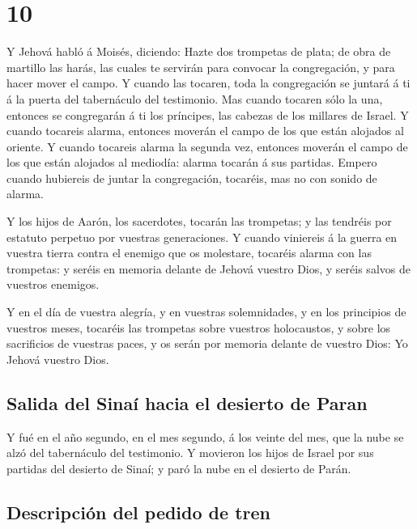 \hypertarget{section-04-10}{%
\section{10}\label{section-04-10}}

 Y Jehová habló á Moisés, diciendo:  Hazte
dos trompetas de plata; de obra de martillo las harás, las cuales te
servirán para convocar la congregación, y para hacer mover el campo.
 Y cuando las tocaren, toda la congregación se juntará á
ti á la puerta del tabernáculo del testimonio.  Mas cuando
tocaren sólo la una, entonces se congregarán á ti los príncipes, las
cabezas de los millares de Israel.  Y cuando tocareis
alarma, entonces moverán el campo de los que están alojados al oriente.
 Y cuando tocareis alarma la segunda vez, entonces moverán
el campo de los que están alojados al mediodía: alarma tocarán á sus
partidas.  Empero cuando hubiereis de juntar la
congregación, tocaréis, mas no con sonido de alarma.

 Y los hijos de Aarón, los sacerdotes, tocarán las
trompetas; y las tendréis por estatuto perpetuo por vuestras
generaciones.  Y cuando viniereis á la guerra en vuestra
tierra contra el enemigo que os molestare, tocaréis alarma con las
trompetas: y seréis en memoria delante de Jehová vuestro Dios, y seréis
salvos de vuestros enemigos.

 Y en el día de vuestra alegría, y en vuestras
solemnidades, y en los principios de vuestros meses, tocaréis las
trompetas sobre vuestros holocaustos, y sobre los sacrificios de
vuestras paces, y os serán por memoria delante de vuestro Dios: Yo
Jehová vuestro Dios.

\hypertarget{salida-del-sinauxed-hacia-el-desierto-de-paran}{%
\subsection{Salida del Sinaí hacia el desierto de
Paran}\label{salida-del-sinauxed-hacia-el-desierto-de-paran}}

 Y fué en el año segundo, en el mes segundo, á los veinte
del mes, que la nube se alzó del tabernáculo del testimonio.
 Y movieron los hijos de Israel por sus partidas del
desierto de Sinaí; y paró la nube en el desierto de Parán.

\hypertarget{descripciuxf3n-del-pedido-de-tren}{%
\subsection{Descripción del pedido de
tren}\label{descripciuxf3n-del-pedido-de-tren}}

